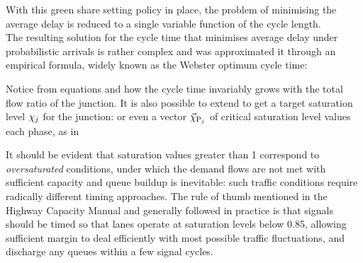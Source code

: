 With this green share setting policy in place, the problem of minimising the average delay is reduced to a single variable function of the cycle length.\\
The resulting solution for the cycle time that minimises average delay under probabilistic arrivals is rather complex and was approximated it through an empirical formula, widely known as the Webster optimum cycle time:

Notice from equations  and  how the cycle time invariably grows with the total flow ratio of the junction.
It is also possible to extend  to get a target saturation level $\chi_j$
for the junction:
or even a vector $\vec{\chi}_{\mathrm{P}_j}$ of critical saturation level values each phase, as in

It should be evident that saturation values greater than 1 correspond to \emph{oversaturated}
conditions, under which the demand flows are not met with sufficient capacity and queue
buildup is inevitable: such traffic conditions require radically different timing approaches.
The rule of thumb mentioned in the Highway Capacity Manual \hcm and generally followed in practice is that
signals should be timed so that lanes operate at saturation levels below 0.85, allowing sufficient margin to deal efficiently with most possible traffic fluctuations, and discharge any queues within a few signal cycles.
